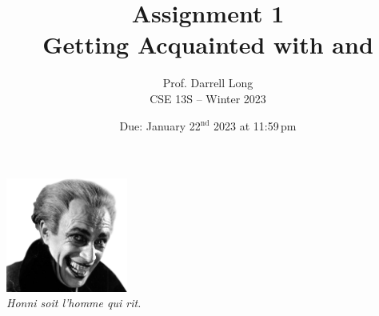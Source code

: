 \documentclass[12pt]{article}
\title{Assignment 1 \\ Getting Acquainted with \Unix{} and \C{}}
\author{Prof. Darrell Long \\
CSE 13S -- Winter 2023}
\date{Due: January 22$^\text{nd}$ 2023 at 11:59\,pm}
\begin{document}
\maketitle












\vfill
\begin{center}
\includegraphics[width=0.3\textwidth]{images/cv.png} \\
\emph{Honni soit l'homme qui rit.}
\end{center}
\end{document}
